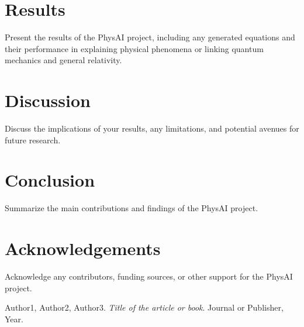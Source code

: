 \documentclass[11pt]{article}
\begin{document}
\section{Results}
    Present the results of the PhysAI project, including any generated equations and their performance in explaining physical phenomena or linking quantum mechanics and general relativity.

\section{Discussion}
    Discuss the implications of your results, any limitations, and potential avenues for future research.

\section{Conclusion}
    Summarize the main contributions and findings of the PhysAI project.

\section*{Acknowledgements}
    Acknowledge any contributors, funding sources, or other support for the PhysAI project.

\begin{thebibliography}{9}
        Author1, Author2, Author3.
        \emph{Title of the article or book}.
        Journal or Publisher, Year.
\end{thebibliography}
\end{document}
